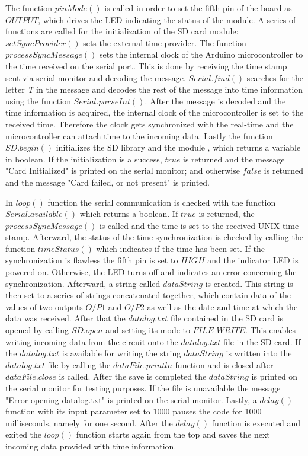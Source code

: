 The function $pinMode()$ is called in order to set the fifth pin of the board as $OUTPUT$, which drives the LED indicating the status of the module. A series of functions are called for the initialization of the SD card module: $setSyncProvider()$ sets the external time provider. \cite{Time} The function $processSyncMessage()$ sets the internal clock of the Arduino microcontroller to the time received on the serial port. This is done by receiving the time stamp sent via serial monitor and decoding the message. $Serial.find()$ searches for the letter \textit{T} in the message and decodes the rest of the message into time information using the function $Serial.parseInt()$. After the message is decoded and the time information is acquired, the internal clock of the microcontroller is set to the received time. Therefore the clock gets synchronized with the real-time and the microcontroller can attach time to the incoming data. Lastly the function $SD.begin()$ initializes the SD library and the module \cite{SD}, which returns a variable in boolean. If the initialization is a success, $true$ is returned and the message "Card Initialized" is printed on the serial monitor; and otherwise $false$ is returned and the message "Card failed, or not present" is printed. \par 
In $loop()$ function the serial communication is checked with the function $Serial.available()$ which returns a boolean. If $true$ is returned, the $processSyncMessage()$ is called and the time is set to the received UNIX time stamp. Afterward, the status of the time synchronization is checked by calling the function $timeStatus()$ which indicates if the time has been set. \cite{Time} If the synchronization is flawless the fifth pin is set to $HIGH$ and the indicator LED is powered on. Otherwise, the LED turns off and indicates an error concerning the synchronization. Afterward, a string called $dataString$ is created. This string is then set to a series of strings concatenated together, which contain data of the values of two outputs $O/P1$ and $O/P2$ as well as the date and time at which the data was received. After that the $datalog.txt$ file contained in the SD card is opened by calling $SD.open$ and setting its mode to $FILE\_WRITE$. This enables writing incoming data from the circuit onto the $datalog.txt$ file in the SD card. If the $datalog.txt$ is available for writing the string $dataString$ is written into the $datalog.txt$ file by calling the $dataFile.println$ function and is closed after $dataFile.close$ is called. After the save is completed the $dataString$ is printed on the serial monitor for testing purposes. If the file is unavailable the message "Error opening datalog.txt" is printed on the serial monitor. Lastly, a $delay()$ function with its input parameter set to $1000$ pauses the code for 1000 milliseconds, namely for one second. After the $delay()$ function is executed and exited the $loop()$ function starts again from the top and saves the next incoming data provided with time information.         


